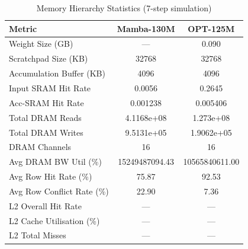 \begin{table}[h]\centering
    \caption{Memory Hierarchy Statistics (7-step simulation)}
    \label{tab:memory_stats_gen}
    \begin{tabular}{lcc}\hline
    Metric & Mamba-130M & OPT-125M \\\hline
            Weight Size (GB) & --- & 0.090 \\
        Scratchpad Size (KB) & 32768 & 32768 \\
        Accumulation Buffer (KB) & 4096 & 4096 \\
        Input SRAM Hit Rate & 0.0056 & 0.2645 \\
        Acc-SRAM Hit Rate & 0.001238 & 0.005406 \\
        Total DRAM Reads & 4.1168e+08 & 1.273e+08 \\
        Total DRAM Writes & 9.5131e+05 & 1.9062e+05 \\
        DRAM Channels & 16 & 16 \\
        Avg DRAM BW Util (\%) & 15249487094.43 & 10565840611.00 \\
        Avg Row Hit Rate (\%) & 75.87 & 92.53 \\
        Avg Row Conflict Rate (\%) & 22.90 & 7.36 \\
        L2 Overall Hit Rate & --- & --- \\
        L2 Cache Utilisation (\%) & --- & --- \\
        L2 Total Misses & --- & --- \\
\hline\end{tabular}\end{table}